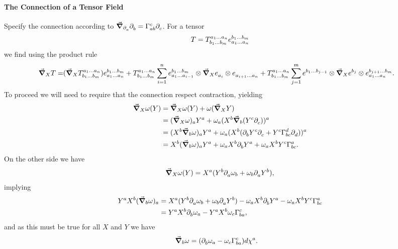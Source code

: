 \paragraph{The Connection of a Tensor Field}
Specify the connection according to $\dcov{\del{a}{}}{\del{b}{}} = \chris{c}{a}{b}\del{c}{}$. For a tensor
\begin{align*}
	T = \tensor*{T}{^{a_{1}\dots a_{n}}_{b_{1}\dots b_{m}}}\tensor*{e}{^{b_{1}\dots b_{m}}_{a_{1}\dots a_{n}}}
\end{align*}
we find using the product rule
\begin{align*}
	\dcov{X}{T} =& (\dcov{X}{\tensor*{T}{^{a_{1}\dots a_{n}}_{b_{1}\dots b_{m}}}})\tensor*{e}{^{b_{1}\dots b_{m}}_{a_{1}\dots a_{n}}} + \tensor*{T}{^{a_{1}\dots a_{n}}_{b_{1}\dots b_{m}}}\sum\limits_{i = 1}^{n}\tensor*{e}{^{b_{1}\dots b_{m}}_{a_{1}\dots a_{i - 1}}}\otimes\dcov{X}{\tensor*{e}{_{a_{i}}}}\otimes\tensor*{e}{_{a_{i + 1}\dots a_{n}}} + \tensor*{T}{^{a_{1}\dots a_{n}}_{b_{1}\dots b_{m}}}\sum\limits_{j = 1}^{m}\tensor*{e}{^{b_{1}\dots b_{j - 1}}}\otimes\dcov{X}{\tensor*{e}{^{b_{j}}}}\otimes\tensor*{e}{^{b_{j + 1}\dots b_{m}}_{a_{1}\dots a_{n}}}.
\end{align*}
To proceed we will need to require that the connection respect contraction, yielding
\begin{align*}
	\dcov{X}{\omega(Y)} &= \dcov{X}{\omega}(Y) + \omega(\dcov{X}{Y}) \\
	                    &= (\dcov{X}{\omega})_{a}Y^{a} + \omega_{a}(X^{b}\dcov{b}{(Y^{c}\del{c}{})})^{a} \\
	                    &= (X^{b}\dcov{b}{\omega})_{a}Y^{a} + \omega_{a}(X^{b}(\del{b}{Y^{c}}\del{c}{} + Y^{c}\chris{d}{b}{c}\del{d}{}))^{a} \\
	                    &= X^{b}(\dcov{b}{\omega})_{a}Y^{a} + \omega_{a}X^{b}\del{b}{Y^{a}} + \omega_{a}X^{b}Y^{c}\chris{a}{b}{c}.
\end{align*}
On the other side we have
\begin{align*}
	\grad_{X}{\omega(Y)} = X^{a}(Y^{b}\partial^{}_{a}\omega_{b} + \omega_{b}\partial^{}_{a}Y^{b}),
\end{align*}
implying
\begin{align*}
	Y^{a}X^{b}(\dcov{b}{\omega})_{a} &= X^{a}(Y^{b}\del{a}{\omega_{b}} + \omega_{b}\del{a}{Y^{b}}) - \omega_{a}X^{b}\del{b}{Y^{a}} - \omega_{a}X^{b}Y^{c}\chris{a}{b}{c} \\
	                                 &= Y^{a}X^{b}\del{b}{\omega_{a}} - Y^{a}X^{b}\omega_{c}\chris{c}{b}{a},
\end{align*}
and as this must be true for all $X$ and $Y$ we have
\begin{align*}
	\dcov{b}{\omega} &= (\del{b}{\omega_{a}} - \omega_{c}\chris{c}{b}{a})\df{\chi^{a}}.
\end{align*}

